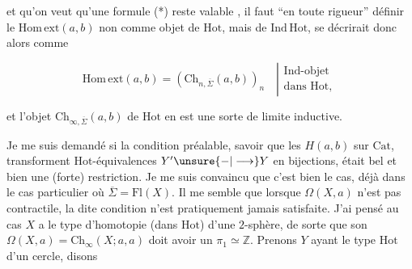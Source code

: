 
et qu'on veut qu'une formule (*) reste valable , il faut ``en toute rigueur'' définir le $\mathrm{Hom\,ext}(a,b)$ non comme objet de $\mathrm{Hot}$, mais de $\mathrm{Ind\,Hot}$,  se décrirait donc alors comme

\[
\mathrm{Hom\,ext}(a,b)=(\mathrm{Ch}_{n,\overline\Sigma}(a,b))_n
\quad\left|\begin{gathered}\text{Ind-objet}\\\text{dans }\mathrm{Hot},\end{gathered}\right.
\]

et l'objet $\mathrm{Ch}_{\infty,\overline\Sigma}(a,b)$ de $\mathrm{Hot}$ en est une sorte de limite inductive.

Je me suis demandé si la condition préalable, savoir que les  $H(a,b)$  sur $\mathrm{Cat}$, transforment $\mathrm{Hot}$-équivalences $Y'\unsure{-|\longrightarrow} Y$ en bijections, était bel et bien une (forte) restriction. Je me suis convaincu que c'est bien le cas, déjà dans le cas particulier où $\overline\Sigma=\mathrm{Fl}(X)$. Il me semble que lorsque  $\Omega(X,a)$ n'est  pas contractile, la dite condition n'est pratiquement jamais satisfaite. J'ai pensé  au cas   $X$ a le type  d'homotopie (dans $\mathrm{Hot}$) d'une $2$-sphère, de sorte que son $\Omega(X,a)=\mathrm{Ch}_\infty(X;a,a)$ doit avoir un $\pi_1\simeq\mathbb Z$. Prenons $Y$ ayant le type  $\mathrm{Hot}$ d'un cercle, disons


